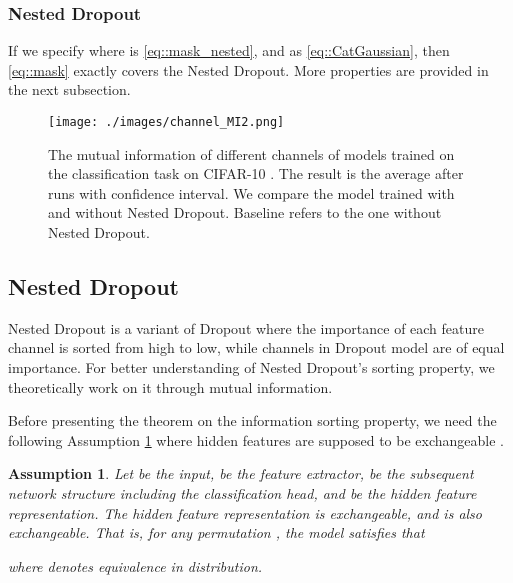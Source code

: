 \documentclass[journal]{IEEEtran}
\newtheorem{assumption}{Assumption}
\begin{document}
\subsubsection{Nested Dropout}
If we specify  where  is \eqref{eq::mask_nested}, and 
 as \eqref{eq::CatGaussian}, then \eqref{eq::mask} exactly covers the Nested Dropout.
More properties are provided in the next subsection.


\begin{figure}[t]
	\begin{minipage}[t]{0.4\textwidth}  
		\centering  
		\texttt{[image: ./images/channel\_MI2.png]}
	\end{minipage}  
	\centering  
	\caption{The mutual information of different channels of models trained on the classification task on CIFAR-10 \cite{krizhevsky2009learning}. 
	The result is the average after  runs with  confidence interval.
	We compare the model trained with and without Nested Dropout. Baseline refers to the one without Nested Dropout.}
	\label{fig::MI}
	\vspace{-3mm}
\end{figure}



\subsection{Nested Dropout} \label{subsec::nested_ranking}
Nested Dropout is a variant of Dropout where the importance of each feature channel is sorted from high to low, while channels in Dropout model are of equal importance.
For better understanding of Nested Dropout's sorting property, we theoretically work on it through mutual information.

Before presenting the theorem on the information sorting property, we need the following Assumption \ref{ass::permu} where hidden features are supposed to be exchangeable \cite{aldous1985exchangeability}.

\begin{assumption} \label{ass::permu}
    Let  be the input,  be the feature extractor,  be the subsequent network structure including the classification head, and  be the hidden feature representation.
    The hidden feature representation  is exchangeable, and  is also exchangeable.
    That is, for any permutation , the model satisfies that
    
    where  denotes equivalence in distribution.
\end{assumption}
\end{document}
